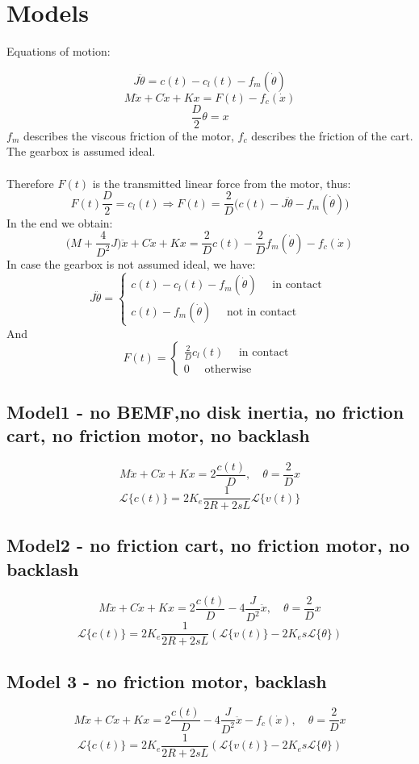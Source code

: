 
\chapter{Models}
Equations of motion:

$$J\ddot{\theta}=c(t)-c_l(t) - f_m(\dot{\theta})$$
$$M\ddot{x}+C\dot{x}+Kx = F(t) - f_c(\dot{x})$$
$$\frac{D}{2}\theta = x$$
$f_m$ describes the viscous friction of the motor, $f_c$ describes the friction of the cart. The gearbox is assumed ideal. \\ \\
Therefore $F(t)$ is the transmitted linear force from the motor, thus:
$$F(t)\frac{D}{2} = c_l(t) \Rightarrow F(t) = \frac{2}{D} \Big(c(t)-J\ddot{\theta}-f_m(\dot{\theta})\Big)$$
In the end we obtain:
$$\Big(M+\frac{4}{D^2} J\Big) \ddot{x}+C\dot{x}+Kx = \frac{2}{D}c(t) -\frac{2}{D}f_m(\dot{\theta}) - f_c(\dot{x})$$
In case the gearbox is not assumed ideal, we have:
$$J\ddot{\theta}= \begin{cases}
c(t)-c_l(t) - f_m(\dot{\theta}) \quad \text{ in contact } \\
c(t)-f_m(\dot{\theta}) \quad \text{ not in contact }
\end{cases}
$$
And
$$F(t) = \begin{cases}
\frac{2}{D}c_l(t)\quad \text{ in contact } \\
0 \quad \text{ otherwise }
\end{cases}
$$

\section{Model1 - no BEMF,no disk inertia, no friction cart, no friction motor, no backlash}
$$M\ddot{x} + C\dot{x}+Kx = 2\frac{c(t)}{D}, \quad \theta = \frac{2}{D}x$$
$$\mathcal{L}\{c(t)\} = 2K_e \frac{1}{2R+2sL} \mathcal{L}\{ v(t)\}$$

\section{Model2 - no friction cart, no friction motor, no backlash}
$$M\ddot{x} + C\dot{x}+Kx = 2\frac{c(t)}{D}  - 4\frac{J}{D^2}\ddot{x}, \quad \theta = \frac{2}{D}x$$
$$\mathcal{L}\{c(t)\} = 2K_e \frac{1}{2R+2sL} (\mathcal{L}\{ v(t)\}-2K_e s \mathcal{L}\{\theta \})$$


\section{Model 3 - no friction motor, backlash}
$$M\ddot{x} + C\dot{x}+Kx = 2\frac{c(t)}{D} - 4\frac{J}{D^2}\ddot{x} - f_c(\dot{x}), \quad \theta = \frac{2}{D}x$$
$$\mathcal{L}\{c(t)\} = 2K_e \frac{1}{2R+2sL} (\mathcal{L}\{ v(t)\}-2K_e s \mathcal{L}\{\theta \})$$



